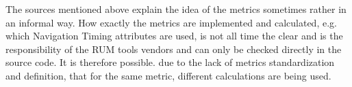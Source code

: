 The sources mentioned above explain the idea of the metrics sometimes rather in an informal way.
How exactly the metrics are implemented and calculated, e.g. which Navigation Timing attributes are used, is not all time the clear and is the responsibility of the RUM tools vendors and can only be checked directly in the source code.
It is therefore possible. due to the lack of metrics standardization and definition, that for the same metric, different calculations are being used.






